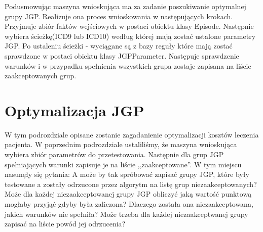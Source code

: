 Podusmowując maszyna wnioskująca ma za zadanie poszukiwanie optymalnej grupy JGP. Realizuje ona proces wnioskowania w następujących krokach. Przyjmuje zbiór faktów wejściowych w postaci obiektu klasy Episode. Następnie wybiera ścieżkę(ICD9 lub ICD10) według której mają zostać ustalone parametry JGP. Po ustaleniu ścieżki - wyciągane są z bazy reguły które mają zostać sprawdzone w postaci obiektu klasy JGPParameter. Następuje sprawdzenie warunków i w przypadku spełnienia wszystkich grupa zostaje zapisana na liście zaakceptowanych grup.


\section{Optymalizacja JGP}
\label{sec:optymalizacjaJGP}

W tym podrozdziale opisane zostanie zagadanienie optymalizacji kosztów leczenia pacjenta. W poprzednim podrozdziale ustaliliśmy, że maszyna wnioskująca wybiera zbiór parametrów do przetestowania. Następnie dla grup JGP spełniających warunki zapisuje je na liście ,,zaakceptowane''. W tym miejscu nasunęły się pytania: A może by tak spróbować zapisać grupy JGP, które były testowane a zostały odrzucone przez algorytm na listę grup niezaakceptowanych? Może dla każdej niezaakceptowanej grupy JGP obliczyć jaką wartość punktową mogłaby przyjąć gdyby była zaliczona? Dlaczego została ona niezaakceptowana, jakich warunków nie spełniła? Może trzeba dla każdej niezaakceptwanej grupy zapisać na liście powód jej odrzucenia? 

